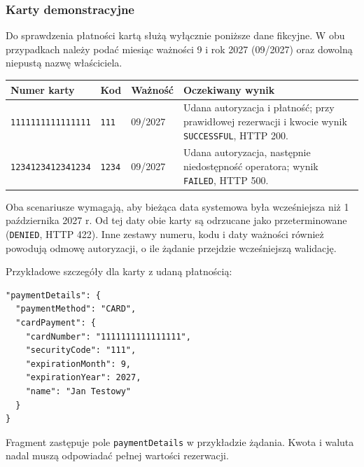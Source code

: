 \subsubsection{Karty demonstracyjne}

Do sprawdzenia płatności kartą służą wyłącznie poniższe dane fikcyjne.
W obu przypadkach należy podać miesiąc ważności 9 i rok 2027
(09/2027) oraz dowolną niepustą nazwę właściciela.
\begin{center}
\begin{tabularx}{\textwidth}{lllX}
\toprule
Numer karty & Kod & Ważność & Oczekiwany wynik \\
\midrule
\texttt{1111111111111111} & \texttt{111} & 09/2027 &
Udana autoryzacja i płatność; przy prawidłowej rezerwacji i kwocie
wynik \texttt{SUCCESSFUL}, HTTP 200. \\
\texttt{1234123412341234} & \texttt{1234} & 09/2027 &
Udana autoryzacja, następnie niedostępność operatora;
wynik \texttt{FAILED}, HTTP 500. \\
\bottomrule
\end{tabularx}
\end{center}

Oba scenariusze wymagają, aby bieżąca data systemowa była wcześniejsza
niż 1 października 2027 r. Od tej daty obie karty są odrzucane jako
przeterminowane (\texttt{DENIED}, HTTP 422). Inne zestawy numeru,
kodu i daty ważności również powodują odmowę autoryzacji,
o ile żądanie przejdzie wcześniejszą walidację.

Przykładowe szczegóły dla karty z udaną płatnością:
\begin{verbatim}
"paymentDetails": {
  "paymentMethod": "CARD",
  "cardPayment": {
    "cardNumber": "1111111111111111",
    "securityCode": "111",
    "expirationMonth": 9,
    "expirationYear": 2027,
    "name": "Jan Testowy"
  }
}
\end{verbatim}
Fragment zastępuje pole \texttt{paymentDetails} w przykładzie żądania.
Kwota i waluta nadal muszą odpowiadać pełnej wartości rezerwacji.
